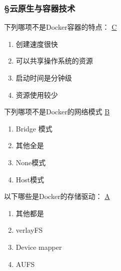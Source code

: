 \subsubsection*{\S 云原生与容器技术}
\setcounter{problemname}{0}

\begin{problem}
	下列哪项不是Docker容器的特点：
	\uline{C}    
    \vspace{-0.8em}
    \begin{multicols}{2}
        \begin{enumerate}[label=\Alph*.]
            \item 创建速度很快
            \item 可以共享操作系统的资源
            \item 启动时间是分钟级
            \item 资源使用较少
        \end{enumerate}
    \end{multicols}
    \vspace{-1em}
\end{problem}



\begin{problem}
	下列哪项不是Docker的网络模式
	\uline{B}    
    \vspace{-0.8em}
    \begin{multicols}{4}
        \begin{enumerate}[label=\Alph*.]
            \item Bridge 模式
            \item 其他全是
            \item None模式
            \item Host模式
        \end{enumerate}
    \end{multicols}
    \vspace{-1em}
\end{problem}



\begin{problem}
    以下哪些是Docker的存储驱动：
	\uline{A}    
    \vspace{-0.8em}
    \begin{multicols}{4}
        \begin{enumerate}[label=\Alph*.]
            \item 其他都是
            \item verlayFS
            \item Device mapper
            \item AUFS
        \end{enumerate}
    \end{multicols}
    \vspace{-1em}
\end{problem}



